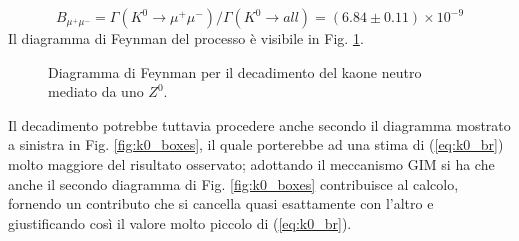 \documentclass{subnucbo}
\begin{document}
\begin{equation}
        B _ { \mu ^ { + } \mu ^ { - } } = \Gamma \left( K ^ { 0 } \rightarrow \mu ^ { + } \mu ^ { - } \right) / \Gamma \left( K ^{ 0 } \rightarrow a l l \right) = ( 6.84 \pm 0.11 ) \times 10 ^ { - 9 }
        \label{eq:k0_br}
\end{equation}
Il diagramma di Feynman del processo è visibile in Fig. \ref{fig:k0_z_decay}.
\begin{figure}[!h]
        \centering
        \caption{Diagramma di Feynman per il decadimento del kaone neutro mediato da uno $Z^{0}$.}
        \label{fig:k0_z_decay}
\end{figure}
Il decadimento potrebbe tuttavia procedere anche secondo il diagramma mostrato a sinistra in Fig. \ref{fig:k0_boxes}, il quale porterebbe ad una stima di (\ref{eq:k0_br}) molto maggiore del risultato osservato; adottando il meccanismo GIM si ha che anche il secondo diagramma di Fig. \ref{fig:k0_boxes} contribuisce al calcolo, fornendo un contributo che si cancella quasi esattamente con l'altro e giustificando così il valore molto piccolo di (\ref{eq:k0_br}).
\end{document}
